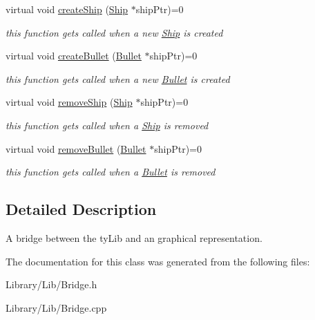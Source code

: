 \begin{DoxyCompactItemize}
\item 
\hypertarget{classty_lib_1_1_bridge_a63087dee13087e4848b92ece48afcc38}{}virtual void \hyperlink{classty_lib_1_1_bridge_a63087dee13087e4848b92ece48afcc38}{create\+Ship} (\hyperlink{classty_lib_1_1_ship}{Ship} $\ast$ship\+Ptr)=0\label{classty_lib_1_1_bridge_a63087dee13087e4848b92ece48afcc38}

\begin{DoxyCompactList}\small\item\em this function get\textquotesingle{}s called when a new \hyperlink{classty_lib_1_1_ship}{Ship} is created \end{DoxyCompactList}\item 
\hypertarget{classty_lib_1_1_bridge_a053fb9bb7ef5cd0b81df767d2cc5977a}{}virtual void \hyperlink{classty_lib_1_1_bridge_a053fb9bb7ef5cd0b81df767d2cc5977a}{create\+Bullet} (\hyperlink{classty_lib_1_1_bullet}{Bullet} $\ast$ship\+Ptr)=0\label{classty_lib_1_1_bridge_a053fb9bb7ef5cd0b81df767d2cc5977a}

\begin{DoxyCompactList}\small\item\em this function get\textquotesingle{}s called when a new \hyperlink{classty_lib_1_1_bullet}{Bullet} is created \end{DoxyCompactList}\item 
\hypertarget{classty_lib_1_1_bridge_a121a2ebc3fdbf27bdd113d7f7b735395}{}virtual void \hyperlink{classty_lib_1_1_bridge_a121a2ebc3fdbf27bdd113d7f7b735395}{remove\+Ship} (\hyperlink{classty_lib_1_1_ship}{Ship} $\ast$ship\+Ptr)=0\label{classty_lib_1_1_bridge_a121a2ebc3fdbf27bdd113d7f7b735395}

\begin{DoxyCompactList}\small\item\em this function get\textquotesingle{}s called when a \hyperlink{classty_lib_1_1_ship}{Ship} is removed \end{DoxyCompactList}\item 
\hypertarget{classty_lib_1_1_bridge_a012343861fd8943afe57b004683bcf5d}{}virtual void \hyperlink{classty_lib_1_1_bridge_a012343861fd8943afe57b004683bcf5d}{remove\+Bullet} (\hyperlink{classty_lib_1_1_bullet}{Bullet} $\ast$ship\+Ptr)=0\label{classty_lib_1_1_bridge_a012343861fd8943afe57b004683bcf5d}

\begin{DoxyCompactList}\small\item\em this function get\textquotesingle{}s called when a \hyperlink{classty_lib_1_1_bullet}{Bullet} is removed \end{DoxyCompactList}\end{DoxyCompactItemize}


\subsection{Detailed Description}
A bridge between the ty\+Lib and an graphical representation. 

The documentation for this class was generated from the following files\+:\begin{DoxyCompactItemize}
\item 
Library/\+Lib/Bridge.\+h\item 
Library/\+Lib/Bridge.\+cpp\end{DoxyCompactItemize}
